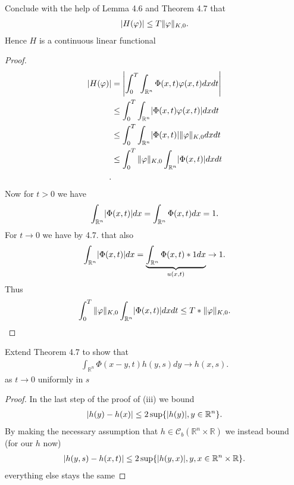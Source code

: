\begin{exercise}[d]
 Conclude with the help of Lemma 4.6 and Theorem 4.7 that 
 \begin{align*}
   \abs{H(\phi )}\le T \|\phi \|_{K,0}
 .\end{align*}
 Hence $H$ is a continuous linear functional
\end{exercise}
\begin{proof}
 \begin{align*}
   \abs{H(\phi )}  &= \abs*{\int_{0}^{T}  \int_{\mathbb{R}^{n} }\Phi(x,t)\phi(x,t) dx dt}\\
                  &\le \int_{0}^{T}  \int_{\mathbb{R}^{n} }\abs{\Phi(x,t)\phi(x,t)} dx dt\\
                  &\le \int_{0}^{T}  \int_{\mathbb{R}^{n} }\abs{\Phi(x,t)}\|\phi \|_{K,0} dx dt\\
                  &\le \int_{0}^{T} \|\phi \|_{K,0} \int_{\mathbb{R}^{n} }\abs{\Phi(x,t)} dx dt\\
 .\end{align*} 
 Now for $t>0$ we have 
 \begin{align*}
   \int_{\mathbb{R}^{n} } \abs{\Phi(x,t)} dx  =  \int_{\mathbb{R}^{n} } \Phi(x,t) dx  = 1
 .\end{align*}
 For $t\to 0$ we have by 4.7. that also
 \begin{align*}
   \int_{\mathbb{R}^{n} } \abs{\Phi(x,t)} dx  =  \underbrace{\int_{\mathbb{R}^{n} } \Phi(x,t)*1 dx }_{u(x,t)} \to 1
 .\end{align*}
 Thus 
 \begin{align*}
   \int_{0}^{T} \|\phi \|_{K,0} \int_{\mathbb{R}^{n} }\abs{\Phi(x,t)} dx dt \le T*\|\phi \|_{K,0} 
 .\end{align*}
\end{proof}
\begin{exercise}[e]
 Extend Theorem 4.7  to show that 
 \begin{align*}
   \int_{\mathbb{R}^{n} }\Phi(x-y,t)h(y,s)dy \to h(x,s)
 .\end{align*}
 as $t\to 0$ uniformly in $s$
\end{exercise}
\begin{proof}
  In the last step of the proof of (iii) we bound 
  \begin{align*}
    \abs{h(y)-h(x)} \le 2 \sup \{\abs{h(y)} , y \in  \mathbb{R}^{n} \}
  .\end{align*}
  By making the necessary assumption that $h \in  \mathcal{C}_b(\mathbb{R}^{n} \times  \mathbb{R})$ we instead bound (for our $h$ now)
    \begin{align*}
    \abs{h(y,s)-h(x,t)} \le 2 \sup \{\abs{h(y,x)} , y,x \in  \mathbb{R}^{n}\times \mathbb{R} \}
  .\end{align*}
  everything else stays the same 
  \end{proof}
